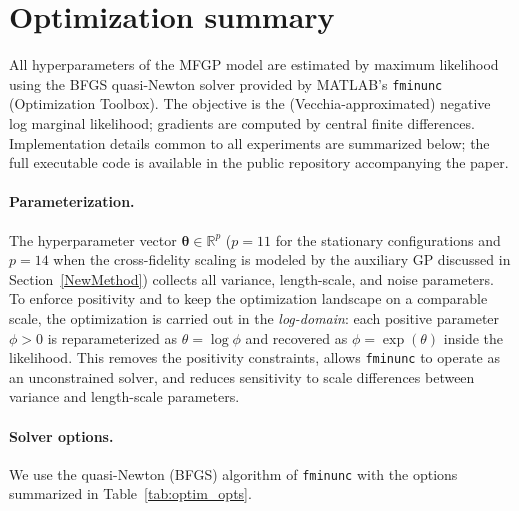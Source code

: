 \documentclass[12pt]{article}
\begin{document}
\section{Optimization summary}\label{app:optim}

All hyperparameters of the MFGP model are estimated by maximum likelihood using the BFGS quasi-Newton solver provided by MATLAB's \texttt{fminunc} (Optimization Toolbox). The objective is the (Vecchia-approximated) negative log marginal likelihood; gradients are computed by central finite differences. Implementation details common to all experiments are summarized below; the full executable code is available in the public repository accompanying the paper.

\paragraph{Parameterization.} The hyperparameter vector $\bm{\theta}\in\mathbb{R}^{p}$ ($p=11$ for the stationary configurations and $p=14$ when the cross-fidelity scaling is modeled by the auxiliary GP discussed in Section~\ref{NewMethod}) collects all variance, length-scale, and noise parameters. To enforce positivity and to keep the optimization landscape on a comparable scale, the optimization is carried out in the \emph{log-domain}: each positive parameter $\phi>0$ is reparameterized as $\theta=\log\phi$ and recovered as $\phi=\exp(\theta)$ inside the likelihood. This removes the positivity constraints, allows \texttt{fminunc} to operate as an unconstrained solver, and reduces sensitivity to scale differences between variance and length-scale parameters.

\paragraph{Solver options.} We use the quasi-Newton (BFGS) algorithm of \texttt{fminunc} with the options summarized in Table~\ref{tab:optim_opts}.
\end{document}
